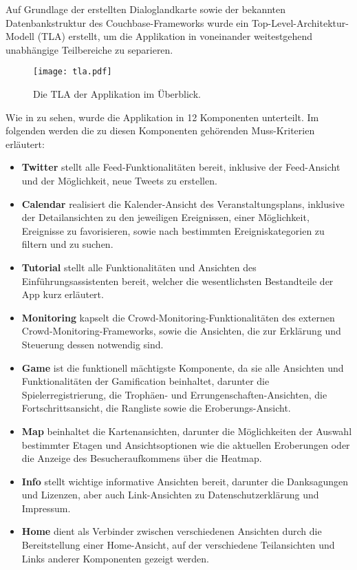 Auf Grundlage der erstellten Dialoglandkarte sowie der bekannten Datenbankstruktur des Couchbase-Frameworks wurde ein Top-Level-Architektur-Modell (TLA) erstellt, um die Applikation in voneinander weitestgehend unabhängige Teilbereiche zu separieren.

\begin{figure}[H]
\texttt{[image: tla.pdf]}
\caption{Die TLA der Applikation im Überblick.}\label{fig:tla}
\end{figure}

Wie in  zu sehen, wurde die Applikation in 12 Komponenten unterteilt. Im folgenden werden die zu diesen Komponenten gehörenden Muss-Kriterien erläutert:

\begin{itemize}
    \item \textbf{Twitter} stellt alle Feed-Funktionalitäten bereit, inklusive der Feed-Ansicht und der Möglichkeit, neue Tweets zu erstellen.
    \item \textbf{Calendar} realisiert die Kalender-Ansicht des Veranstaltungsplans, inklusive der Detailansichten zu den jeweiligen Ereignissen, einer Möglichkeit, Ereignisse zu favorisieren, sowie nach bestimmten Ereigniskategorien zu filtern und zu suchen.
    \item \textbf{Tutorial} stellt alle Funktionalitäten und Ansichten des Einführungsassistenten bereit, welcher die wesentlichsten Bestandteile der App kurz erläutert.
    \item \textbf{Monitoring} kapselt die Crowd-Monitoring-Funktionalitäten des externen Crowd-Monitoring-Frameworks, sowie die Ansichten, die zur Erklärung und Steuerung dessen notwendig sind.
    \item \textbf{Game} ist die funktionell mächtigste Komponente, da sie alle Ansichten und Funktionalitäten der Gamification beinhaltet, darunter die Spielerregistrierung, die Trophäen- und Errungenschaften-Ansichten, die Fortschrittsansicht, die Rangliste sowie die Eroberungs-Ansicht.
    \item \textbf{Map} beinhaltet die Kartenansichten, darunter die Möglichkeiten der Auswahl bestimmter Etagen und Ansichtsoptionen wie die aktuellen Eroberungen oder die Anzeige des Besucheraufkommens über die Heatmap.
    \item \textbf{Info} stellt wichtige informative Ansichten bereit, darunter die Danksagungen und Lizenzen, aber auch Link-Ansichten zu Datenschutzerklärung und Impressum.
    \item \textbf{Home} dient als Verbinder zwischen verschiedenen Ansichten durch die Bereitstellung einer Home-Ansicht, auf der verschiedene Teilansichten und Links anderer Komponenten gezeigt werden.

\end{itemize}
